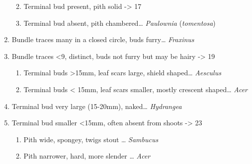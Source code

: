 \documentclass[openany]{book}
\providecommand{\tightlist}{%
  \setlength{\itemsep}{0pt}\setlength{\parskip}{0pt}}
\begin{document}
\begin{enumerate}
  \begin{enumerate}
  \def\labelenumii{\arabic{enumii}.}
  \setcounter{enumii}{14}
  \tightlist
  \item
    Terminal bud present, pith solid -\textgreater{} 17
  \item
    Terminal bud absent, pith chambered\ldots{} \emph{Paulownia} (\emph{tomentosa})
  \end{enumerate}
\item
  Bundle traces many in a closed circle, buds furry\ldots{} \emph{Fraxinus}
\item
  Bundle traces \textless{}9, distinct, buds not furry but may be hairy -\textgreater{} 19

  \begin{enumerate}
  \def\labelenumii{\arabic{enumii}.}
  \setcounter{enumii}{18}
  \tightlist
  \item
    Terminal buds \textgreater{}15mm, leaf scars large, shield shaped\ldots{} \emph{Aesculus}
  \item
    Terminal buds \textless{} 15mm, leaf scars smaller, mostly crescent shaped\ldots{} \emph{Acer}
  \end{enumerate}
\item
  Terminal bud very large (15-20mm), naked\ldots{} \emph{Hydrangea}
\item
  Terminal bud smaller \textless{}15mm, often absent from shoots -\textgreater{} 23

  \begin{enumerate}
  \def\labelenumii{\arabic{enumii}.}
  \setcounter{enumii}{22}
  \tightlist
  \item
    Pith wide, spongey, twigs stout \ldots{} \emph{Sambucus}
  \item
    Pith narrower, hard, more slender \ldots{} \emph{Acer}
  \end{enumerate}
\end{enumerate}


\end{document}
